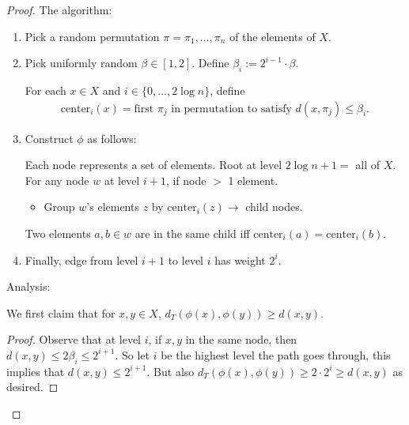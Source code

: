 \documentclass{report}
\begin{document}
\begin{proof}
    The algorithm:
    \begin{enumerate}
        \item Pick a random permutation $\pi = \pi_1, \ldots, \pi_n$ of the elements of $X$.
        \item Pick uniformly random $\beta \in [1, 2]$. Define $\beta_i := 2^{i-1} \cdot \beta$.

        For each $x \in X$ and $i \in \{0, \ldots, 2\log n\}$, define 
        \begin{align*}
            \text{center}_i(x) = \text{first $\pi_j$ in permutation to satisfy $d(x, \pi_j) \leq \beta_i$}.
        \end{align*}
        \item Construct $\phi$ as follows:
        
        Each node represents a set of elements. Root at level $2\log n + 1 = $ all of $X$. For any node $w$ at level $i+1$, if node $>$ 1 element.
        \begin{itemize}
            \item Group $w$'s elements $z$ by $\text{center}_i(z) \to $ child nodes. 
        \end{itemize}
        Two elements $a, b \in w$ are in the same child iff $\text{center}_i(a) = \text{center}_i(b)$.
        \item Finally, edge from level $i+1$ to level $i$ has weight $2^{i}$. 
    \end{enumerate}
    Analysis:

    We first claim that for $x, y\in X$, $d_T(\phi(x), \phi(y)) \geq d(x, y)$. 
    \begin{proof}
        Observe that at level $i$, if $x,y$ in the same node, then $d(x, y) \leq 2\beta_i \leq 2^{i+1}$. So let $i$ be the highest level the path goes through, this implies that $d(x, y) \leq 2^{i+1}$. But also $d_T(\phi(x), \phi(y)) \geq 2\cdot 2^i \geq d(x, y)$ as desired.
    \end{proof}


\end{proof}
\end{document}
